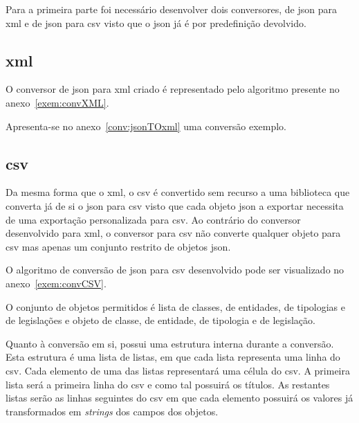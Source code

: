 Para a primeira parte foi necessário desenvolver dois conversores, de \acrshort{json} para \acrshort{xml} e de \acrshort{json} para \acrshort{csv} visto que o \acrshort{json} já é por predefinição devolvido.

\subsection{\acrshort{xml}}
O conversor de \acrshort{json} para \acrshort{xml} criado é representado pelo algoritmo presente no anexo~\ref{exem:convXML}.

Apresenta-se no anexo~\ref{conv:jsonTOxml} uma conversão exemplo.

\subsection{\acrshort{csv}}

Da mesma forma que o \acrshort{xml}, o \acrshort{csv} é convertido sem recurso a uma biblioteca que converta já de si o \acrshort{json} para \acrshort{csv} visto que cada objeto \acrshort{json} a exportar necessita de uma exportação personalizada para \acrshort{csv}. Ao contrário do conversor desenvolvido para \acrshort{xml}, o conversor para \acrshort{csv} não converte qualquer objeto para \acrshort{csv} mas apenas um conjunto restrito de objetos \acrshort{json}.

O algoritmo de conversão de \acrshort{json} para \acrshort{csv} desenvolvido pode ser visualizado no anexo~\ref{exem:convCSV}.

O conjunto de objetos permitidos é lista de classes, de entidades, de tipologias e de legislações e objeto de classe, de entidade, de tipologia e de legislação.

Quanto à conversão em si, possui uma estrutura interna durante a conversão. Esta estrutura é uma lista de listas, em que cada lista representa uma linha do \acrshort{csv}. Cada elemento de uma das listas representará uma célula do \acrshort{csv}. A primeira lista será a primeira linha do \acrshort{csv} e como tal possuirá os títulos. As restantes listas serão as linhas seguintes do \acrshort{csv} em que cada elemento possuirá os valores já transformados em \textit{strings} dos campos dos objetos.

